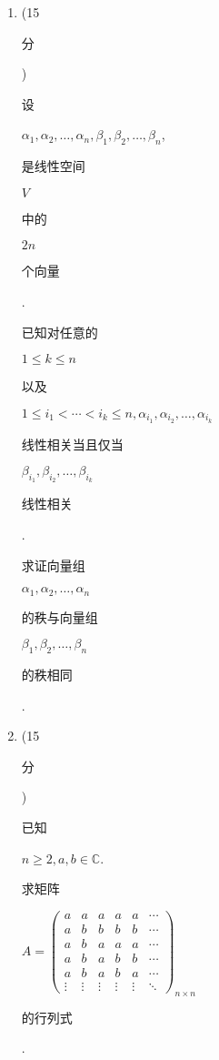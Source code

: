 \documentclass[10pt]{article}
\begin{document}
\begin{enumerate}
  \item (15 \begin{CJK}{UTF8}{mj}分\end{CJK}) \begin{CJK}{UTF8}{mj}设\end{CJK} $\alpha_{1}, \alpha_{2}, \ldots, \alpha_{n}, \beta_{1}, \beta_{2}, \ldots, \beta_{n}$, \begin{CJK}{UTF8}{mj}是线性空间\end{CJK} $V$ \begin{CJK}{UTF8}{mj}中的\end{CJK} $2 n$ \begin{CJK}{UTF8}{mj}个向量\end{CJK}. \begin{CJK}{UTF8}{mj}已知对任意的\end{CJK} $1 \leqslant k \leqslant n$ \begin{CJK}{UTF8}{mj}以及\end{CJK} $1 \leqslant i_{1}<\cdots<i_{k} \leqslant n, \alpha_{i_{1}}, \alpha_{i_{2}}, \ldots, \alpha_{i_{k}}$ \begin{CJK}{UTF8}{mj}线性相关当且仅当\end{CJK} $\beta_{i_{1}}, \beta_{i_{2}}, \ldots, \beta_{i_{k}}$ \begin{CJK}{UTF8}{mj}线性相关\end{CJK}. \begin{CJK}{UTF8}{mj}求证向量组\end{CJK} $\alpha_{1}, \alpha_{2}, \ldots, \alpha_{n}$ \begin{CJK}{UTF8}{mj}的秩与向量组\end{CJK} $\beta_{1}, \beta_{2}, \ldots, \beta_{n}$ \begin{CJK}{UTF8}{mj}的秩相同\end{CJK}.

  \item (15 \begin{CJK}{UTF8}{mj}分\end{CJK}) \begin{CJK}{UTF8}{mj}已知\end{CJK} $n \geqslant 2, a, b \in \mathbb{C}$. \begin{CJK}{UTF8}{mj}求矩阵\end{CJK} $A=\left(\begin{array}{cccccc}a & a & a & a & a & \cdots \\ a & b & b & b & b & \cdots \\ a & b & a & a & a & \cdots \\ a & b & a & b & b & \cdots \\ a & b & a & b & a & \cdots \\ \vdots & \vdots & \vdots & \vdots & \vdots & \ddots\end{array}\right)_{n \times n}$ \begin{CJK}{UTF8}{mj}的行列式\end{CJK}.


\end{enumerate}
\end{document}
